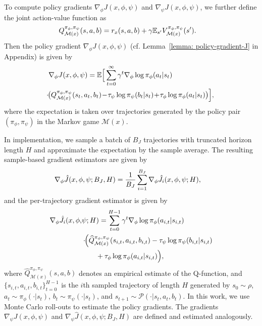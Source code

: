 \documentclass{article}
\theoremstyle{plain}
\theoremstyle{definition}
\theoremstyle{remark}
\def\E{\mathbb E}
\def\cM{\mathcal M}
\def\cP{\mathcal P}
\begin{document}
To compute policy gradients $\nabla_\phi J(x,\phi,\psi)$ and $\nabla_\psi J(x,\phi,\psi)$, we further define the joint action-value function as
\vspace{-2mm}
\begin{align}
    Q^{\pi_\phi,\pi_\psi}_{\cM(x)}(s,a,b) & = r_x(s,a,b) + \gamma \E_{s^\prime} V^{\pi_\phi,\pi_\psi}_{\cM(x)}(s^\prime). \label{eq: q-function-definition} 
    \vspace{-2mm}
\end{align}
Then the policy gradient $\nabla_\phi J(x,\phi,\psi)$ 
(cf. Lemma~\ref{lemma: policy-gradient-J} in Appendix) is given by
\vspace{-2mm}
\begin{align}
   & \nabla_\phi J(x,\phi,\psi)  = \E \Big[ \sum_{t=0}^{\infty } \gamma^t \nabla_\phi \log \pi_\phi(a_t |s_t) \notag
   \\\notag
   &  \!\!\!\cdot\!\!\big(Q^{\pi_\phi,\pi_\psi}_{\cM(x)}(s_t,a_t,b_t) 
   \!-\! \tau_\psi \log \pi_\psi(b_t|s_t) 
   \!+\! \tau_\phi \log \pi_\phi(a_t|s_t) 
    \big) \Big], 
    \vspace{-2mm}
\end{align}
where the expectation is taken over trajectories generated by the policy pair $(\pi_\phi,\pi_\psi)$ in the Markov game $\cM(x)$. 
 
In implementation, we sample a batch of $B_J$ trajectories with truncated horizon length $H$ and approximate the expectation by the sample average. The resulting sample-based gradient estimators are given by
\vspace{-2mm}
\begin{align}
    \nabla_\phi \hat{J}(x,\phi,\psi; B_J,H) & = \frac{1}{B_J} \sum_{i=1}^{B_J} \nabla_\phi \hat{J}_i(x,\phi,\psi;H), 
    \vspace{-2mm}
\end{align}
and the per-trajectory gradient estimator is given by
\vspace{-2mm}
\begin{align}\notag
   \nabla_\phi  \hat{J}_i(x,\phi,&\psi;H)   = \sum_{t=0}^{H-1} \gamma^t \nabla_\phi \log \pi_\phi (a_{i,t}|s_{i,t})  
    \\ 
    & \cdot\!\!\Big( \notag \widehat{Q}^{\pi_\phi,\pi_\psi}_{\cM(x)}(s_{i,t},a_{i,t},b_{i,t}) - \tau_\psi \log \pi_\psi(b_{i,t}|s_{i,t}) \notag 
    \\
    &\quad\quad  + \tau_\phi\log \pi_\phi(a_{i,t}|s_{i,t}) \Big),
    \vspace{-2mm}
\end{align}
where $\widehat{Q}^{\pi_\phi,\pi_\psi}_{\cM(x)}(s,a,b)$ denotes an empirical estimate of the Q-function, and $\{s_{i,t},a_{i,t},b_{i,t}\}_{t=0}^{H-1}$ is the $i$th sampled trajectory of length $H$ generated by $s_0 \sim \rho$, $a_t \sim \pi_\phi(\cdot|s_t)$, $b_t \sim \pi_\psi(\cdot|s_t)$, and $s_{t+1} \sim \cP(\cdot|s_t,a_t,b_t)$. In this work, we use Monte Carlo roll-outs to estimate the policy gradients. The gradients $\nabla_\psi J(x,\phi,\psi)$ and $\nabla_{\psi} \hat{J}(x,\phi,\psi; B_J,H)$ are defined and estimated analogously.
\end{document}
